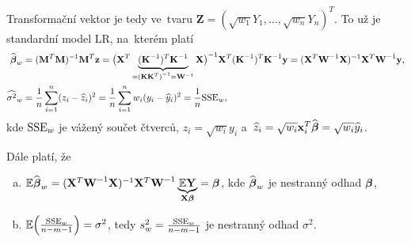 Transformační vektor je tedy ve~tvaru $\textbf{Z} = (\sqrt{w_1}Y_1,...,\sqrt{w_n}Y_n)^T$. To už je standardní model LR, na~kterém platí
\begin{align*}
\widehat{\boldsymbol{\beta}}_w & = {(\textbf{M}^T\textbf{M})^{-1}}\textbf{M}^T\textbf{z} = {\big(\mathbf{X}^T\underbrace{(\textbf{K}^{-1})^T {\textbf{K}^{-1}}}_{ = {{(\textbf{K}\textbf{K}^T)}^{-1}} = {\textbf{W}^{-1}}}\mathbf{X}\big)^{-1}}\mathbf{X}^T({\textbf{K}^{-1}})^T{\textbf{K}^{-1}}\mathbf{y} = {(\mathbf{X}^T{\textbf{W}^{-1}}\mathbf{X})^{-1}}\mathbf{X}^T{\textbf{W}^{-1}}\mathbf{y}, \\
\widehat{{\sigma}^2}_w & = \frac{1}{n}\sum\limits_{i=1}^{n} (z_i-\widehat{z}_i)^2 = \frac{1}{n}\sum\limits_{i=1}^{n} w_i(y_i-\widehat{y}_i)^2 = \frac{1}{n}\mathrm{SSE}_w,
\end{align*}
 kde $\mathrm{SSE}_w$ je vážený součet čtverců, $z_i = \sqrt{w_i}y_i$ a~$\widehat{z}_i = \sqrt{w_i}\mathbf{x}_i^T\widehat{\boldsymbol{\beta}} = \sqrt{w_i}\widehat{y}_i$.
 
Dále platí, že
\begin{enumerate}[a)]
	\item $\mathbb{E}\widehat{\boldsymbol{\beta}}_w = {(\mathbf{X}^T{\textbf{W}^{-1}}\mathbf{X})^{-1}}\mathbf{X}^T{\textbf{W}^{-1}}\underbrace{\mathbb{E} \mathbf{Y}}_{\mathbf{X}\boldsymbol{\beta}} = \boldsymbol{\beta}$, kde $\widehat{\boldsymbol{\beta}}_w$ je nestranný odhad $\boldsymbol{\beta}$,
	\item $\mathbb{E}\Big(\frac{\mathrm{SSE}_w}{n-m-1}\Big) = \sigma^2$, tedy $s_w^2 = \frac{\mathrm{SSE}_w}{n-m-1}$ je nestranný odhad $\sigma^2$.
\end{enumerate}

